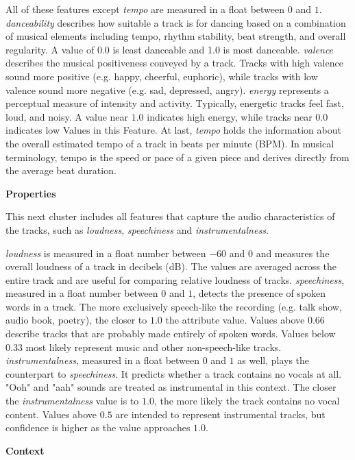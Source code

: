 All of these features except \emph{tempo} are measured in a float between \(0\) and \(1\). 
\emph{danceability} describes how suitable a track is for dancing based on a combination of musical elements
including tempo, rhythm stability, beat strength, and overall regularity. A value of \(0.0\) is least danceable and 1.0 is most danceable.
\emph{valence} describes the musical positiveness conveyed by a track. 
Tracks with high valence sound more positive (e.g. happy, cheerful, euphoric),
while tracks with low valence sound more negative (e.g. sad, depressed, angry).  
\emph{energy} represents a perceptual measure of intensity and activity. Typically, energetic tracks feel fast, loud, and noisy. 
A value near \(1.0\) indicates high energy, while tracks near \(0.0\) indicates low Values in this Feature. 
At last, \emph{tempo} holds the information about the overall estimated tempo of a track in beats per
minute (BPM). In musical terminology, tempo is the speed or pace of a given piece and derives directly from the
average beat duration. \cite[]{Features}

\textbf{Properties}

This next cluster includes all features that capture the audio characteristics of the tracks,
such as \emph{loudness}, \emph{speechiness} and \emph{instrumentalness}.

\emph{loudness} is measured in a float number between \(-60\) and \(0\) and measures the overall loudness
of a track in decibels (dB). 
The values are averaged across the entire track and are useful for comparing relative
loudness of tracks. 
\emph{speechiness}, measured in a float number between \(0\) and \(1\), detects the presence of spoken words in a track. 
The more exclusively speech-like the recording (e.g. talk show, audio book, poetry),
the closer to \(1.0\) the attribute value. 
Values above \(0.66\) describe tracks that are probably made entirely of spoken words. Values below \(0.33\) most likely represent music and other non-speech-like tracks. 
\emph{instrumentalness}, measured in a float between \(0\) and \(1\) as well, plays the counterpart to \emph{speechiness}.
It predicts whether a track contains no vocals at all. "Ooh" and "aah" sounds are treated as instrumental in this context.
The closer the \emph{instrumentalness} value is to \(1.0\), the more likely the track contains no vocal content. 
Values above \(0.5\) are intended to represent instrumental tracks, but confidence is higher as the value approaches \(1.0\). \cite[]{Features}

\textbf{Context}

